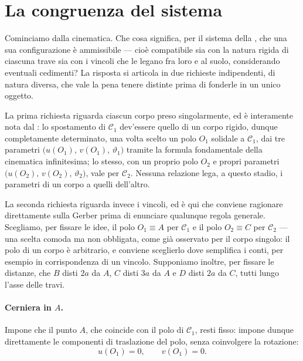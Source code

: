 \section{La congruenza del sistema}\label{sec:congruenza_SCR}

Cominciamo dalla cinematica. Che cosa significa, per il sistema della
, che una sua configurazione è ammissibile ---
cioè compatibile sia con la natura rigida di ciascuna trave sia con i
vincoli che le legano fra loro e al suolo, considerando eventuali cedimenti? La risposta si articola in due
richieste indipendenti, di natura diversa, che vale la pena tenere
distinte prima di fonderle in un unico oggetto.

La prima richiesta riguarda ciascun corpo preso singolarmente, ed è
interamente nota dal : lo spostamento
di $\mathcal{C}_1$ dev'essere quello di un corpo rigido, dunque
completamente determinato, una volta scelto un polo $O_1$ solidale a
$\mathcal{C}_1$, dai tre parametri $\bigl(u(O_1),\,v(O_1),\,\vartheta_1\bigr)$
tramite la formula fondamentale della cinematica infinitesima; lo stesso,
con un proprio polo $O_2$ e propri parametri $\bigl(u(O_2),\,v(O_2),\,
\vartheta_2\bigr)$, vale per $\mathcal{C}_2$. Nessuna relazione lega, a
questo stadio, i parametri di un corpo a quelli dell'altro.

La seconda richiesta riguarda invece i vincoli, ed è qui che conviene
ragionare direttamente sulla Gerber prima di enunciare qualunque regola
generale. Scegliamo, per fissare le idee, il polo $O_1\equiv A$ per
$\mathcal{C}_1$ e il polo $O_2\equiv C$ per $\mathcal{C}_2$ --- una scelta
comoda ma non obbligata, come già osservato per il corpo singolo: il
polo di un corpo è arbitrario, e conviene sceglierlo dove semplifica i
conti, per esempio in corrispondenza di un vincolo. Supponiamo inoltre,
per fissare le distanze, che $B$ disti $2a$ da $A$, $C$ disti $3a$ da
$A$ e $D$ disti $2a$ da $C$, tutti lungo l'asse delle travi.

\paragraph{Cerniera in $A$.} Impone che il punto $A$, che coincide
con il polo di $\mathcal{C}_1$, resti fisso: impone dunque direttamente le
componenti di traslazione del polo, senza coinvolgere la rotazione:
\begin{equation}\label{eq:vinc_A_gerber}
	u(O_1) = 0, \qquad v(O_1) = 0.
\end{equation}

